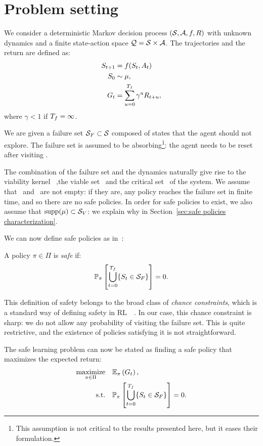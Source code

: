 \section{Problem setting} \label{sec:setting}
We consider a deterministic Markov decision process $(\mathcal{S}, \mathcal{A}, f, R)$ with unknown dynamics and a finite state-action space $\mathcal{Q} = \mathcal{S}\times\mathcal{A}$. The trajectories and the return are defined as:
\begin{align}
	S_{t+1} & = f(S_t, A_t)\\
	S_0 & \sim \mu,\\
	G_t & = \sum_{u = 0}^{{T_f}} \gamma^uR_{t+u},
\end{align}
where $\gamma < 1$ if ${T_f} = \infty$.\par
We are given a failure set ${\mathcal{S}_{F}}\subset\mathcal{S}$ composed of states that the agent should not explore. The failure set is assumed to be absorbing\footnote{This assumption is not critical to the results presented here, but it eases their formulation.}: the agent needs to be reset after visiting \SF.\par
The combination of the failure set and the dynamics naturally give rise to the viability kernel \SV~,the viable set \QV~and the critical set \QC~of the system. We assume that \SV~and \QV~are not empty: if they are, any policy reaches the failure set in finite time, and so there are no safe policies. In order for safe policies to exist, we also assume that $\operatorname{supp}(\mu) \subset {\ensuremath{\mathcal{S}}_{V}}$: we explain why in Section~\ref{sec:safe policies characterization}.\par
We can now define safe policies as in~\cite{heim2020learnable}:
\begin{definition}
	A policy $\pi \in \Pi$ is\emph{ safe} if:
	\begin{equation}
		\mathbb{P}_\pi\left[\bigcup_{t=0}^{{T_f}}\{S_t\in{\ensuremath{\mathcal{S}}_{F}}\}\right] = 0. \label{eq:safety def}
	\end{equation}
\end{definition}
This definition of safety belongs to the broad class of\emph{ chance constraints}, which is a standard way of defining safety in RL~\cite{geibel2005risk}~\cite{paternain2019safe}. In our case, this chance constraint is sharp: we do not allow any probability of visiting the failure set. This is quite restrictive, and the existence of policies satisfying it is not straightforward.\par
The safe learning problem can now be stated as finding a safe policy that maximizes the expected return:
\begin{equation}
	\begin{aligned}
		\underset{\pi\in\Pi}{\text{maximize}} & \quad\mathbb{E}_\pi\left(G_t\right),\\
		\text{s.t.} & \quad \mathbb{P}_\pi\left[\bigcup_{t=0}^{{T_f}}\{S_t\in{\ensuremath{\mathcal{S}}_{F}}\}\right] = 0.
	\end{aligned} \label{eq:chance constrained problem}
\end{equation}
